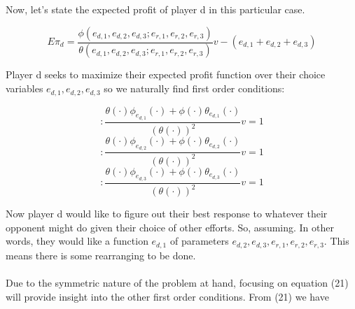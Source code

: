 \documentclass[a4paper,12pt]{article}
\begin{document}
\noindent Now, let's state the expected profit of player d in this particular case.

\begin{equation}
E\pi_d = \frac{\phi(e_{d,1},e_{d,2},e_{d,3};e_{r,1},e_{r,2},e_{r,3})}{\theta(e_{d,1},e_{d,2},e_{d,3};e_{r,1},e_{r,2},e_{r,3})}v-(e_{d,1} + e_{d,2} + e_{d,3})
\end{equation}

\noindent Player d seeks to maximize their expected profit function over their choice variables $e_{d,1},e_{d,2},e_{d,3}$ so we naturally find first order conditions:

\begin{equation}
[e_{d,1}]: \frac{\theta(\cdot)\phi_{e_{d,1}}(\cdot) + \phi(\cdot)\theta_{e_{d,1}}(\cdot)}{(\theta(\cdot))^2}v = 1
\end{equation}
\begin{equation}
[e_{d,2}]: \frac{\theta(\cdot)\phi_{e_{d,2}}(\cdot) + \phi(\cdot)\theta_{e_{d,2}}(\cdot)}{(\theta(\cdot))^2}v = 1
\end{equation}
\begin{equation}
[e_{d,3}]: \frac{\theta(\cdot)\phi_{e_{d,3}}(\cdot) + \phi(\cdot)\theta_{e_{d,3}}(\cdot)}{(\theta(\cdot))^2}v = 1
\end{equation}

\noindent Now player d would like to figure out their best response to whatever their opponent might do given their choice of other efforts. So, assuming. In other words, they would like a function $e_{d,1}$ of parameters $ e_{d,2},e_{d,3},e_{r,1},e_{r,2},e_{r,3} $. This means there is some rearranging to be done. \\ \\
\noindent Due to the symmetric nature of the problem at hand, focusing on equation (21) will provide insight into the other first order conditions. From (21) we have
\end{document}
